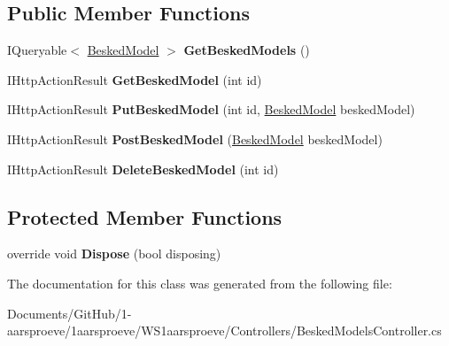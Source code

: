 \subsection*{Public Member Functions}
\begin{DoxyCompactItemize}
\item 
\hypertarget{class_w_s1aarsproeve_1_1_controllers_1_1_besked_models_controller_a7c9a73b4f20560fac146d59a2ccfa829}{}I\+Queryable$<$ \hyperlink{class_w_s1aarsproeve_1_1_besked_model}{Besked\+Model} $>$ {\bfseries Get\+Besked\+Models} ()\label{class_w_s1aarsproeve_1_1_controllers_1_1_besked_models_controller_a7c9a73b4f20560fac146d59a2ccfa829}

\item 
\hypertarget{class_w_s1aarsproeve_1_1_controllers_1_1_besked_models_controller_aadb3cc05f25dbb4151e100928e8e6664}{}I\+Http\+Action\+Result {\bfseries Get\+Besked\+Model} (int id)\label{class_w_s1aarsproeve_1_1_controllers_1_1_besked_models_controller_aadb3cc05f25dbb4151e100928e8e6664}

\item 
\hypertarget{class_w_s1aarsproeve_1_1_controllers_1_1_besked_models_controller_a0c779139db842bb923996125698a8baa}{}I\+Http\+Action\+Result {\bfseries Put\+Besked\+Model} (int id, \hyperlink{class_w_s1aarsproeve_1_1_besked_model}{Besked\+Model} besked\+Model)\label{class_w_s1aarsproeve_1_1_controllers_1_1_besked_models_controller_a0c779139db842bb923996125698a8baa}

\item 
\hypertarget{class_w_s1aarsproeve_1_1_controllers_1_1_besked_models_controller_ac38460d958b72d3572ee0dd2f960f28f}{}I\+Http\+Action\+Result {\bfseries Post\+Besked\+Model} (\hyperlink{class_w_s1aarsproeve_1_1_besked_model}{Besked\+Model} besked\+Model)\label{class_w_s1aarsproeve_1_1_controllers_1_1_besked_models_controller_ac38460d958b72d3572ee0dd2f960f28f}

\item 
\hypertarget{class_w_s1aarsproeve_1_1_controllers_1_1_besked_models_controller_a0e31e1ca36464d3cb905f71198146e9d}{}I\+Http\+Action\+Result {\bfseries Delete\+Besked\+Model} (int id)\label{class_w_s1aarsproeve_1_1_controllers_1_1_besked_models_controller_a0e31e1ca36464d3cb905f71198146e9d}

\end{DoxyCompactItemize}
\subsection*{Protected Member Functions}
\begin{DoxyCompactItemize}
\item 
\hypertarget{class_w_s1aarsproeve_1_1_controllers_1_1_besked_models_controller_a9108cf9c51f908fd6c0537c13e32698b}{}override void {\bfseries Dispose} (bool disposing)\label{class_w_s1aarsproeve_1_1_controllers_1_1_besked_models_controller_a9108cf9c51f908fd6c0537c13e32698b}

\end{DoxyCompactItemize}


The documentation for this class was generated from the following file\+:\begin{DoxyCompactItemize}
\item 
Documents/\+Git\+Hub/1-\/aarsproeve/1aarsproeve/\+W\+S1aarsproeve/\+Controllers/Besked\+Models\+Controller.\+cs\end{DoxyCompactItemize}

